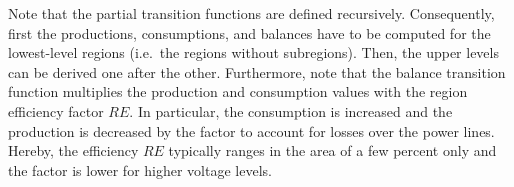 Note that the partial transition functions are defined recursively. Consequently, first the productions, consumptions, and balances have to be computed for the lowest-level regions (i.e.\ the regions without subregions). Then, the upper levels can be derived one after the other. Furthermore, note that the balance transition function multiplies the production and consumption values with the region efficiency factor $RE$. In particular, the consumption is increased and the production is decreased by the factor to account for losses over the power lines. Hereby, the efficiency $RE$ typically ranges in the area of a few percent only and the factor is lower for higher voltage levels.